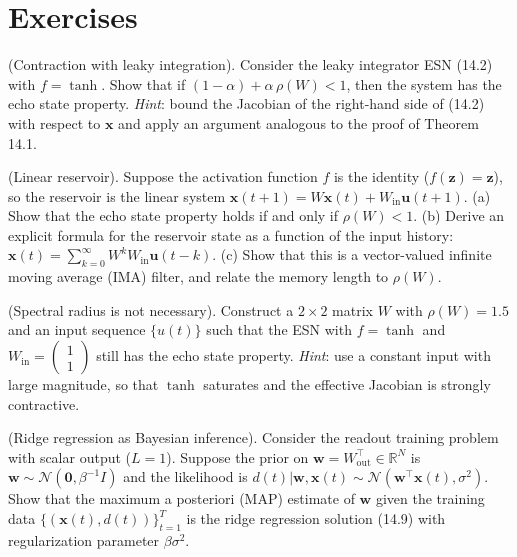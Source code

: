 \bigskip


\section*{Exercises}

\begin{exercise}
(Contraction with leaky integration). Consider the leaky integrator ESN (14.2) with $f = \tanh$. Show that if $(1-\alpha) + \alpha\,\rho(W) < 1$, then the system has the echo state property. \textit{Hint}: bound the Jacobian of the right-hand side of (14.2) with respect to $\mathbf{x}$ and apply an argument analogous to the proof of Theorem 14.1.
\end{exercise}


\begin{exercise}
(Linear reservoir). Suppose the activation function $f$ is the identity ($f(\mathbf{z}) = \mathbf{z}$), so the reservoir is the linear system $\mathbf{x}(t+1) = W\mathbf{x}(t) + W_{\text{in}}\mathbf{u}(t+1)$.
   (a) Show that the echo state property holds if and only if $\rho(W) < 1$.
   (b) Derive an explicit formula for the reservoir state as a function of the input history: $\mathbf{x}(t) = \sum_{k=0}^{\infty} W^k W_{\text{in}} \mathbf{u}(t-k)$.
   (c) Show that this is a vector-valued infinite moving average (IMA) filter, and relate the memory length to $\rho(W)$.
\end{exercise}


\begin{exercise}
(Spectral radius is not necessary). Construct a $2 \times 2$ matrix $W$ with $\rho(W) = 1.5$ and an input sequence $\{u(t)\}$ such that the ESN with $f = \tanh$ and $W_{\text{in}} = \begin{pmatrix} 1 \\ 1 \end{pmatrix}$ still has the echo state property. \textit{Hint}: use a constant input with large magnitude, so that $\tanh$ saturates and the effective Jacobian is strongly contractive.
\end{exercise}


\begin{exercise}
(Ridge regression as Bayesian inference). Consider the readout training problem with scalar output ($L = 1$). Suppose the prior on $\mathbf{w} = W_{\text{out}}^\top \in \mathbb{R}^N$ is $\mathbf{w} \sim \mathcal{N}(\mathbf{0}, \beta^{-1} I)$ and the likelihood is $d(t) | \mathbf{w}, \mathbf{x}(t) \sim \mathcal{N}(\mathbf{w}^\top \mathbf{x}(t), \sigma^2)$. Show that the maximum a posteriori (MAP) estimate of $\mathbf{w}$ given the training data $\{(\mathbf{x}(t), d(t))\}_{t=1}^T$ is the ridge regression solution (14.9) with regularization parameter $\beta \sigma^2$.
\end{exercise}


